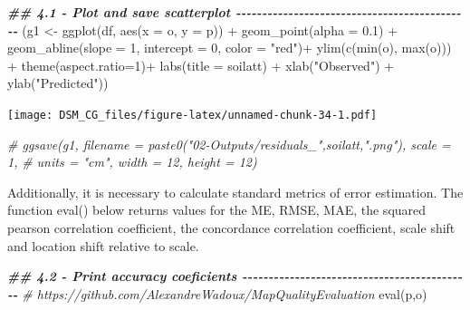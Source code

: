 \documentclass[
  10pt,
  b5paper,
  oneside]{book}
\newenvironment{Shaded}{\begin{snugshade}}{\end{snugshade}}
\newcommand{\AttributeTok}[1]{\textcolor[rgb]{0.77,0.63,0.00}{#1}}
\newcommand{\CommentTok}[1]{\textcolor[rgb]{0.56,0.35,0.01}{\textit{#1}}}
\newcommand{\DecValTok}[1]{\textcolor[rgb]{0.00,0.00,0.81}{#1}}
\newcommand{\DocumentationTok}[1]{\textcolor[rgb]{0.56,0.35,0.01}{\textbf{\textit{#1}}}}
\newcommand{\FloatTok}[1]{\textcolor[rgb]{0.00,0.00,0.81}{#1}}
\newcommand{\FunctionTok}[1]{\textcolor[rgb]{0.00,0.00,0.00}{#1}}
\newcommand{\NormalTok}[1]{#1}
\newcommand{\OtherTok}[1]{\textcolor[rgb]{0.56,0.35,0.01}{#1}}
\newcommand{\SpecialCharTok}[1]{\textcolor[rgb]{0.00,0.00,0.00}{#1}}
\newcommand{\StringTok}[1]{\textcolor[rgb]{0.31,0.60,0.02}{#1}}
\begin{document}
\begin{Shaded}
\begin{Highlighting}[]
\DocumentationTok{\#\# 4.1 {-} Plot and save scatterplot {-}{-}{-}{-}{-}{-}{-}{-}{-}{-}{-}{-}{-}{-}{-}{-}{-}{-}{-}{-}{-}{-}{-}{-}{-}{-}{-}{-}{-}{-}{-}{-}{-}{-}{-}{-}{-}{-}{-}{-}{-}{-}{-}{-}{-} }
\NormalTok{(g1 }\OtherTok{\textless{}{-}} \FunctionTok{ggplot}\NormalTok{(df, }\FunctionTok{aes}\NormalTok{(}\AttributeTok{x =}\NormalTok{ o, }\AttributeTok{y =}\NormalTok{ p)) }\SpecialCharTok{+} 
  \FunctionTok{geom\_point}\NormalTok{(}\AttributeTok{alpha =} \FloatTok{0.1}\NormalTok{) }\SpecialCharTok{+} 
   \FunctionTok{geom\_abline}\NormalTok{(}\AttributeTok{slope =} \DecValTok{1}\NormalTok{, }\AttributeTok{intercept =} \DecValTok{0}\NormalTok{, }\AttributeTok{color =} \StringTok{"red"}\NormalTok{)}\SpecialCharTok{+}
  \FunctionTok{ylim}\NormalTok{(}\FunctionTok{c}\NormalTok{(}\FunctionTok{min}\NormalTok{(o), }\FunctionTok{max}\NormalTok{(o))) }\SpecialCharTok{+} \FunctionTok{theme}\NormalTok{(}\AttributeTok{aspect.ratio=}\DecValTok{1}\NormalTok{)}\SpecialCharTok{+} 
  \FunctionTok{labs}\NormalTok{(}\AttributeTok{title =}\NormalTok{ soilatt) }\SpecialCharTok{+} 
  \FunctionTok{xlab}\NormalTok{(}\StringTok{"Observed"}\NormalTok{) }\SpecialCharTok{+} \FunctionTok{ylab}\NormalTok{(}\StringTok{"Predicted"}\NormalTok{))}
\end{Highlighting}
\end{Shaded}

\texttt{[image: DSM\_CG\_files/figure-latex/unnamed-chunk-34-1.pdf]}

\begin{Shaded}
\begin{Highlighting}[]
\CommentTok{\# ggsave(g1, filename = paste0("02{-}Outputs/residuals\_",soilatt,".png"), scale = 1, }
\CommentTok{\#        units = "cm", width = 12, height = 12)}
\end{Highlighting}
\end{Shaded}

Additionally, it is necessary to calculate standard metrics of error estimation. The function eval() below returns values for the ME, RMSE, MAE, the squared pearson correlation coefficient, the concordance correlation coefficient, scale shift and location shift relative to scale.

\begin{Shaded}
\begin{Highlighting}[]
\DocumentationTok{\#\# 4.2 {-} Print accuracy coeficients {-}{-}{-}{-}{-}{-}{-}{-}{-}{-}{-}{-}{-}{-}{-}{-}{-}{-}{-}{-}{-}{-}{-}{-}{-}{-}{-}{-}{-}{-}{-}{-}{-}{-}{-}{-}{-}{-}{-}{-}{-}{-}{-}{-}}
\CommentTok{\# https://github.com/AlexandreWadoux/MapQualityEvaluation}
\FunctionTok{eval}\NormalTok{(p,o)}
\end{Highlighting}
\end{Shaded}
\end{document}
